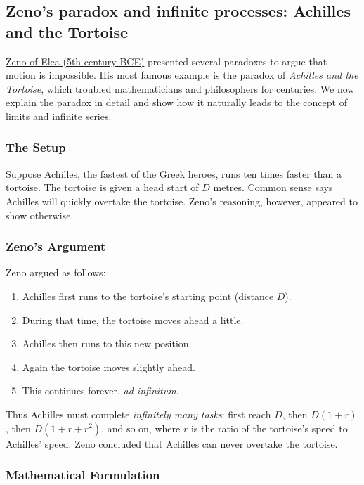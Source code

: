 \subsection{Zeno's paradox and infinite processes: Achilles and the Tortoise}

\href{https://en.wikipedia.org/wiki/Zeno\_of\_Elea}{Zeno of Elea (5th century BCE)} presented several paradoxes to argue that
motion is impossible.  His most famous example is the paradox of
\emph{Achilles and the Tortoise}, which troubled mathematicians and
philosophers for centuries.  We now explain the paradox in detail and
show how it naturally leads to the concept of limits and infinite series.

\subsubsection*{The Setup}

Suppose Achilles, the fastest of the Greek heroes, runs ten times faster
than a tortoise.  The tortoise is given a head start of $D$ metres.
Common sense says Achilles will quickly overtake the tortoise.  Zeno's
reasoning, however, appeared to show otherwise.

\subsubsection*{Zeno's Argument}

Zeno argued as follows:
\begin{enumerate}
    \item Achilles first runs to the tortoise's starting point (distance $D$).
    \item During that time, the tortoise moves ahead a little.
    \item Achilles then runs to this new position.
    \item Again the tortoise moves slightly ahead.
    \item This continues forever, \emph{ad infinitum}.
\end{enumerate}

Thus Achilles must complete \emph{infinitely many tasks}:
first reach $D$, then $D(1+r)$, then $D(1+r+r^2)$, and so on, where
$r$ is the ratio of the tortoise's speed to Achilles' speed.
Zeno concluded that Achilles can never overtake the tortoise.

\subsubsection*{Mathematical Formulation}

